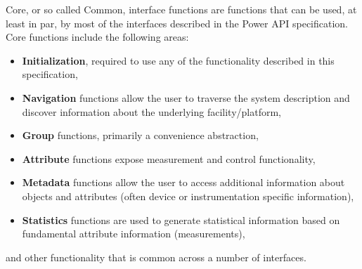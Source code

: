 \newcommand{\ArgHdr}{   \begin{center}
			\begin{tabular}{ | p{5cm} | p{2.1cm} | p{7.5cm} |}
			\hline 
			\textbf{Argument(s)} & \textbf{Input } & \textbf{Description} \\  
			 		     & \textbf{and/or} & \\ 
					     & \textbf{Output} & \\ 
			\hline 
}
\newcommand{\ArgLn}[3]{\texttt{#1} & #2 & #3 \\ \hline}
\newcommand{\ArgFtr}{ 	\end{tabular}
			\end{center}
}



Core, or so called Common, interface functions are functions that can be used, at least in par, by most of the interfaces described in the Power API specification. 
Core functions include the following areas:
\begin{itemize}[noitemsep,nolistsep] 
\item{\textbf{Initialization}, required to use any of the functionality described in this specification, }
\item{\textbf{Navigation}  functions allow the user to traverse the system description and discover information about the underlying facility/platform, }
\item{\textbf{Group} functions, primarily a convenience abstraction,}
\item{\textbf{Attribute} functions expose measurement and control functionality, }
\item{\textbf{Metadata} functions allow the user to access additional information about objects and attributes (often device or instrumentation specific information), }
\item{\textbf{Statistics} functions are used to generate statistical information based on fundamental attribute information (measurements),}
\end{itemize}
and other functionality that is common across a number of interfaces.


